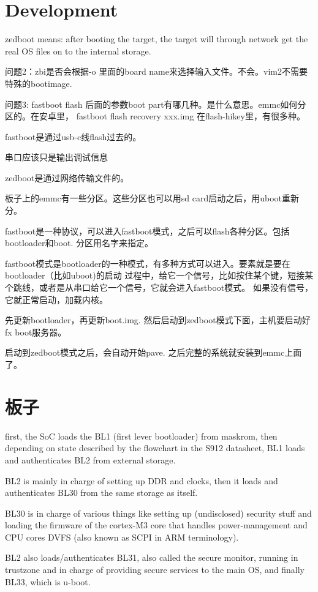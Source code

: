 \section{Development}

zedboot means: after booting the target, the target will through network get the real 
OS files on to the internal storage.

问题2：zbi是否会根据-o 里面的board name来选择输入文件。不会。vim2不需要特殊的bootimage.

问题3: fastboot flash 后面的参数boot part有哪几种。是什么意思。emmc如何分区的。在安卓里，
  fastboot flash recovery xxx.img
在flash-hikey里，有很多种。

fastboot是通过usb-c线flash过去的。

串口应该只是输出调试信息

zedboot是通过网络传输文件的。

板子上的emmc有一些分区。这些分区也可以用sd card启动之后，用uboot重新分。

fastboot是一种协议，可以进入fastboot模式，之后可以flash各种分区。包括bootloader和boot. 
分区用名字来指定。

fastboot模式是bootloader的一种模式，有多种方式可以进入。要素就是要在bootloader（比如uboot)的启动
过程中，给它一个信号，比如按住某个键，短接某个跳线，或者是从串口给它一个信号，它就会进入fastboot模式。
如果没有信号，它就正常启动，加载内核。

先更新bootloader，再更新boot.img. 然后启动到zedboot模式下面，主机要启动好fx boot服务器。

启动到zedboot模式之后，会自动开始pave. 之后完整的系统就安装到emmc上面了。

\section{板子}

first, the SoC loads the BL1 (first lever bootloader) from maskrom, 
then depending on state described by the flowchart in the S912 datasheet, 
BL1 loads and authenticates BL2 from external storage.

BL2 is mainly in charge of setting up DDR and clocks, then it loads and 
authenticates BL30 from the same storage as itself.

BL30 is in charge of various things like setting up (undisclosed) security 
stuff and loading the firmware of the cortex-M3 core that handles power-management and CPU cores DVFS (also known as SCPI in ARM terminology).

BL2 also loads/authenticates BL31, also called the secure monitor, running 
in trustzone and in charge of providing secure services to the main OS, and 
finally BL33, which is u-boot.


